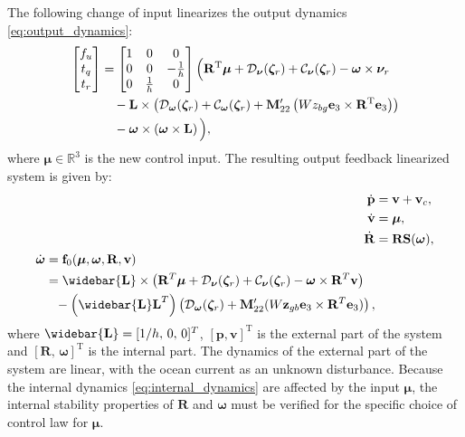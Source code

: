 The following change of input linearizes the output dynamics \eqref{eq:output_dynamics}:
\begin{equation}
    \begin{split}
        \begin{bmatrix}
            f_u \\ t_q \\ t_r
        \end{bmatrix}
        &
        =
        \begin{bmatrix}
            1 & 0 & 0 \\ 0 & 0 & -\frac{1}{h} \\ 0 & \frac{1}{h} & 0
        \end{bmatrix}
        \Big(\mathbf{R}^{\rm T}\bm{\mu} + \mathcal{D}_{\bm{\nu}}(\bm{\zeta}_r) + \mathcal{C}_{\bm{\nu}}(\bm{\zeta}_r) - \bm{\omega} \times \bm{\nu}_r  \\
        &\quad - \mathbf{L} \times \left(\mathcal{D}_{\bm{\omega}}(\bm{\zeta}_r) + \mathcal{C}_{\bm{\omega}}(\bm{\zeta}_r) + \mathbf{M}_{22}^{\prime}\left(Wz_{bg} \mathbf{e}_3 \times \mathbf{R}^{\rm T} \mathbf{e}_3\right)\right) \\
        &\quad - \bm{\omega} \times \left(\bm{\omega} \times \mathbf{L}\right)\Big),
    \end{split}
\end{equation}
where $\bm{\mu} \in \mathbb{R}^3$ is the new control input. The resulting output feedback linearized system is given by:\enlargethispage*{2\baselineskip}
\begin{subequations}\label{eq:hand_linearized_system}
    \begin{align}
        \dot{\mathbf{p}} &= \mathbf{v} + \mathbf{v}_c,\\\label{eq:hand_pos_first_derivative}
        \dot{\mathbf{v}} &= \bm{\mu},\\
        \dot{\mathbf{R}} &=  \mathbf{R} \mathbf{S}(\bm{\omega}),\\
        \begin{split}
        \dot{\bm{\omega}} &= \mathbf{f}_0(\bm{\mu}, \bm{\omega}, \mathbf{R}, \mathbf{v})\\
        &= \widebar{\mathbf{L}} \times \left (\mathbf{R}^T\bm{\mu} + \mathcal{D}_{\bm{\nu}} (\bm{\zeta}_r) + \mathcal{C}_{\bm{\nu}} (\bm{\zeta}_r) - \bm{\omega} \times \mathbf{R}^T \mathbf{v}\right )\\
        &\hphantom{=}- \left(\mathbf{\widebar{L}L}^T\right)\left(\mathcal{D}_{\bm{\omega}} (\bm{\zeta}_r) + \mathbf{M}_{22}' (W \mathbf{z}_{gb}\mathbf{e}_3 \times \mathbf{R}^T \mathbf{e}_3)\right), \label{eq:internal_dynamics}           
        \end{split}
    \end{align}
\end{subequations}
where $\widebar{\mathbf{L}} = [1/h,\, 0,\, 0]^T$, $[\mathbf{p}, \mathbf{v}]^\mathrm{T}$ is the external part of the system and $[\mathbf{R}, \,\bm{\omega}]^\mathrm{T}$ is the internal part. The dynamics of the external part of the system are linear, with the ocean current as an unknown disturbance. Because the internal dynamics \eqref{eq:internal_dynamics} are affected by the input $\bm{\mu}$, the internal stability properties of $\mathbf{R}$ and $\bm{\omega}$ must be verified for the specific choice of control law for $\bm{\mu}$.
